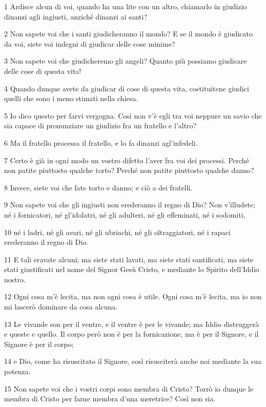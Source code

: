 \par 1 Ardisce alcun di voi, quando ha una lite con un altro, chiamarlo in giudizio dinanzi agli ingiusti, anziché dinanzi ai santi?
\par 2 Non sapete voi che i santi giudicheranno il mondo? E se il mondo è giudicato da voi, siete voi indegni di giudicar delle cose minime?
\par 3 Non sapete voi che giudicheremo gli angeli? Quanto più possiamo giudicare delle cose di questa vita!
\par 4 Quando dunque avete da giudicar di cose di questa vita, costituitene giudici quelli che sono i meno stimati nella chiesa.
\par 5 Io dico questo per farvi vergogna. Così non v'è egli tra voi neppure un savio che sia capace di pronunziare un giudizio fra un fratello e l'altro?
\par 6 Ma il fratello processa il fratello, e lo fa dinanzi agl'infedeli.
\par 7 Certo è già in ogni modo un vostro difetto l'aver fra voi dei processi. Perché non patite piuttosto qualche torto? Perché non patite piuttosto qualche danno?
\par 8 Invece, siete voi che fate torto e danno; e ciò a dei fratelli.
\par 9 Non sapete voi che gli ingiusti non erederanno il regno di Dio? Non v'illudete; né i fornicatori, né gl'idolatri, né gli adulteri, né gli effeminati, né i sodomiti,
\par 10 né i ladri, né gli avari, né gli ubriachi, né gli oltraggiatori, né i rapaci erederanno il regno di Dio.
\par 11 E tali eravate alcuni; ma siete stati lavati, ma siete stati santificati, ma siete stati giustificati nel nome del Signor Gesù Cristo, e mediante lo Spirito dell'Iddio nostro.
\par 12 Ogni cosa m'è lecita, ma non ogni cosa è utile. Ogni cosa m'è lecita, ma io non mi lascerò dominare da cosa alcuna.
\par 13 Le vivande son per il ventre, e il ventre è per le vivande; ma Iddio distruggerà e queste e quello. Il corpo però non è per la fornicazione, ma è per il Signore, e il Signore è per il corpo;
\par 14 e Dio, come ha risuscitato il Signore, così risusciterà anche noi mediante la sua potenza.
\par 15 Non sapete voi che i vostri corpi sono membra di Cristo? Torrò io dunque le membra di Cristo per farne membra d'una meretrice? Così non sia.
